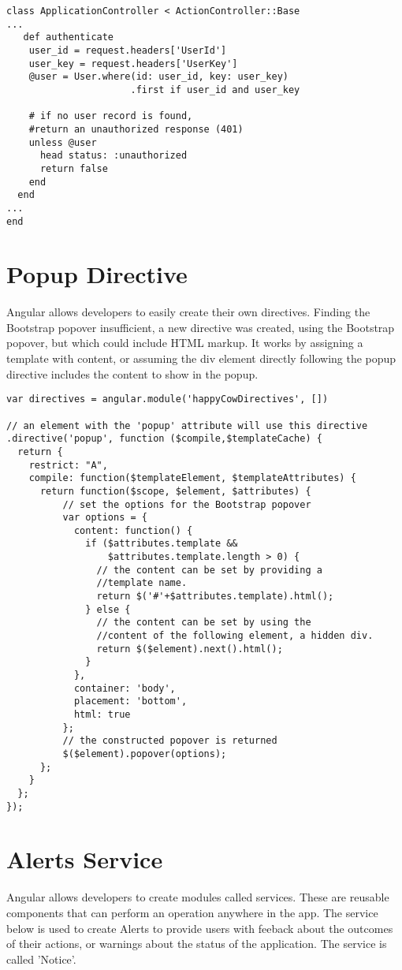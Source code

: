 \begin{verbatim}
class ApplicationController < ActionController::Base
...
   def authenticate
    user_id = request.headers['UserId']
    user_key = request.headers['UserKey']
    @user = User.where(id: user_id, key: user_key)
    			      .first if user_id and user_key
	
	# if no user record is found, 
	#return an unauthorized response (401)
    unless @user
      head status: :unauthorized
      return false
    end
  end
...
end
\end{verbatim}


\section{Popup Directive}
Angular allows developers to easily create their own directives. Finding the Bootstrap popover insufficient, a new directive was created, using the Bootstrap popover, but which could include HTML markup. It works by assigning a template with content, or assuming the div element directly following the popup directive includes the content to show in the popup.

\begin{verbatim}
var directives = angular.module('happyCowDirectives', [])

// an element with the 'popup' attribute will use this directive
.directive('popup', function ($compile,$templateCache) {
  return {
    restrict: "A",
    compile: function($templateElement, $templateAttributes) {
      return function($scope, $element, $attributes) {
          // set the options for the Bootstrap popover
          var options = {
            content: function() {
              if ($attributes.template && 
              	  $attributes.template.length > 0) {
                // the content can be set by providing a 
                //template name.
                return $('#'+$attributes.template).html();
              } else {
                // the content can be set by using the 
                //content of the following element, a hidden div.
                return $($element).next().html();
              }
            },
            container: 'body',
            placement: 'bottom',
            html: true
          };
          // the constructed popover is returned
          $($element).popover(options);
      };
    }
  };
});
\end{verbatim}

\section{Alerts Service}
Angular allows developers to create modules called services. These are reusable components that can perform an operation anywhere in the app. The service below is used to create Alerts to provide users with feeback about the outcomes of their actions, or warnings about the status of the application. The service is called 'Notice'.

